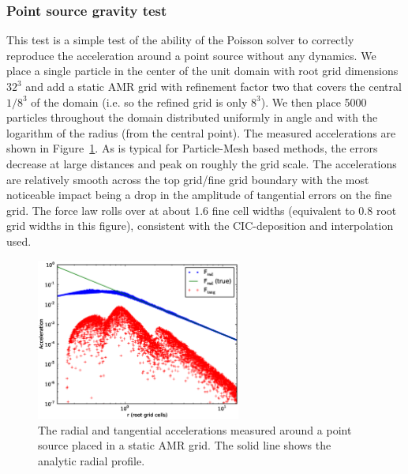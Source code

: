 \subsubsection{Point source gravity test}
\label{sec.test.gravitypointsource}

This test is a simple test of the ability of the Poisson solver to correctly reproduce the acceleration around a point source without any dynamics.  We place a single particle in the center of the unit domain with root grid dimensions $32^3$ and add a static AMR grid with refinement factor two that covers the central $1/8^3$ of the domain (i.e. so the refined grid is only $8^3$).  We then place 5000 particles throughout the domain distributed uniformly in angle and with the logarithm of the radius (from the central point).  The measured accelerations are shown in Figure~\ref{fig.gravitytest}.  As is typical for Particle-Mesh based methods, the errors decrease at large distances and peak on roughly the grid scale.  The accelerations are relatively smooth across the top grid/fine grid boundary with the most noticeable impact being a drop in the amplitude of tangential errors on the fine grid.  The force law rolls over at about 1.6 fine cell widths (equivalent to 0.8 root grid widths in this figure), consistent with the CIC-deposition and interpolation used.

\begin{figure}
\begin{center}
\includegraphics[width=0.6\textwidth]{figures/GravityTest.eps}
\caption{The radial and tangential accelerations measured around a point source placed in a static AMR grid.  The solid line shows the analytic radial profile.}
\label{fig.gravitytest}
\end{center}
\end{figure}